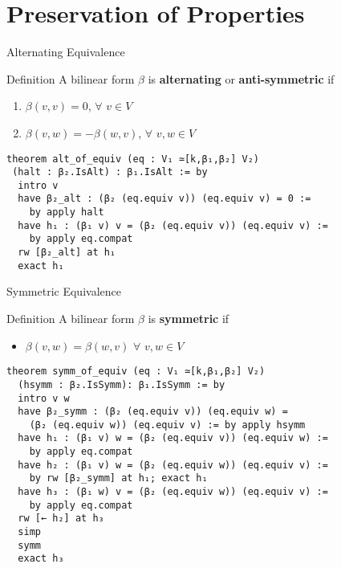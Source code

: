 \documentclass[svgnames]{beamer}
\begin{document}
\section{Preservation of Properties}

\begin{frame}[label={sec:proof_comparison},fragile]{Alternating Equivalence}
\begin{block}{Definition}
A bilinear form $\beta$ is \textbf{alternating} or \textbf{anti-symmetric} if
\begin{enumerate}
    \item $\beta (v,v) = 0$, $\forall$ $v \in V$
    \item $\beta (v,w) = -\beta (w,v)$, $\forall$ $v,w \in V$
\end{enumerate}
\end{block}
\pause
\begin{itemize}
\end{itemize}
{\footnotesize
\begin{verbatim}
theorem alt_of_equiv (eq : V₁ ≃[k,β₁,β₂] V₂) 
 (halt : β₂.IsAlt) : β₁.IsAlt := by
  intro v
  have β₂_alt : (β₂ (eq.equiv v)) (eq.equiv v) = 0 := 
    by apply halt
  have h₁ : (β₁ v) v = (β₂ (eq.equiv v)) (eq.equiv v) := 
    by apply eq.compat
  rw [β₂_alt] at h₁
  exact h₁
\end{verbatim}
}
\end{frame}

\begin{frame}[label={sec:proof_comparison},fragile]{Symmetric Equivalence}
\begin{block}{Definition}
A bilinear form $\beta$ is \textbf{symmetric} if 
\begin{itemize}
    \item $\beta (v,w) = \beta (w,v)$ $\forall$ $v,w \in V$
\end{itemize}
\end{block}
\pause
\begin{itemize}
\end{itemize}
{\tiny
\begin{verbatim}
theorem symm_of_equiv (eq : V₁ ≃[k,β₁,β₂] V₂) 
  (hsymm : β₂.IsSymm): β₁.IsSymm := by
  intro v w
  have β₂_symm : (β₂ (eq.equiv v)) (eq.equiv w) = 
    (β₂ (eq.equiv w)) (eq.equiv v) := by apply hsymm
  have h₁ : (β₁ v) w = (β₂ (eq.equiv v)) (eq.equiv w) := 
    by apply eq.compat
  have h₂ : (β₁ v) w = (β₂ (eq.equiv w)) (eq.equiv v) := 
    by rw [β₂_symm] at h₁; exact h₁
  have h₃ : (β₁ w) v = (β₂ (eq.equiv w)) (eq.equiv v) := 
    by apply eq.compat
  rw [← h₂] at h₃
  simp
  symm
  exact h₃
\end{verbatim}
}
\end{frame}
\end{document}
